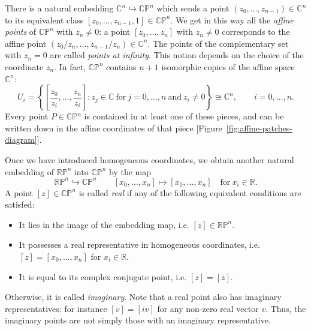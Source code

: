 \documentclass[12pt,a4paper]{article}
\theoremstyle{BoldTopSpacing}
\theoremstyle{BoldTopSpacing}
\theoremstyle{BoldTopSpacing}
\theoremstyle{BoldTopBottomSpacing}
\theoremstyle{BoldTopSpacing}
\theoremstyle{BoldTopBottomSpacing}
\theoremstyle{remark}
\begin{document}
There is a natural embedding $\mathbb{C}^n \hookrightarrow \mathbb{C}\mathbb{P}^n$ which sends a point $(z_{0}, \dots, z_{n-1}) \in \mathbb{C}^n$ to its equivalent class $[z_{0},\dots, z_{n-1}, 1] \in \mathbb{C}\mathbb{P}^n$. We get in this way all the \textit{affine points} of $\mathbb{C}\mathbb{P}^n$ with $z_{n} \neq 0$: a point $[z_{0}, \dots, z_{n}]$ with $z_{n} \neq 0$ corresponds to the affine point $(z_{0}/z_{n}, \dots, z_{n-1}/z_{n}) \in \mathbb{C}^{n}$. The points of the complementary set with $z_{n} = 0$ are called \textit{points at infinity}. This notion depends on the choice of the coordinate $z_{n}$. In fact, $\mathbb{C}\mathbb{P}^n$ contains $n + 1$ isomorphic copies of the affine space $\mathbb{C}^n$:
\[
    U_{i} = \left\{ \left[ \frac{z_{0}}{z_{i}}, \dots, \frac{z_{n}}{z_{i}} \right] : z_{j} \in \mathbb{C} \ \text{for} \ j=0, \dots, n \ \text{and} \ z_{i} \neq 0 \right\} \cong \mathbb{C}^n, \quad \quad i=0, \dots, n.
\]
Every point $P \in \mathbb{C}\mathbb{P}^n$ is contained in at least one of these pieces, and can be written down in the affine coordinates of that piece [Figure~\ref{fig:affine-patches-diagram}].\par
Once we have introduced homogeneous coordinates, we obtain another natural embedding of $\mathbb{R}\mathbb{P}^n$ into $\mathbb{C}\mathbb{P}^n$ by the map
\[
    \mathbb{R}\mathbb{P}^n \hookrightarrow \mathbb{C}\mathbb{P}^n \quad \quad [x_{0}, \dots, x_{n}] \mapsto [x_{0}, \dots, x_{n}] \quad \text{for} \ x_{i} \in \mathbb{R}.
\]
A point $[z] \in \mathbb{C}\mathbb{P}^n$ is called \textit{real} if any of the following equivalent conditions are satisfed:
\begin{itemize}
    \item It lies in the image of the embedding map, i.e. $[z] \in \mathbb{R}\mathbb{P}^n$.
    \item It possesses a real representative in homogeneous coordinates, i.e. $[z] = [x_{0}, \dots, x_{n}]$ for $x_{i} \in \mathbb{R}$.
    \item It is equal to its complex conjugate point, i.e. $[z] = [\bar{z}]$.
\end{itemize}
Otherwise, it is called \textit{imaginary}. Note that a real point also has imaginary representatives: for instance $[v] = [i v]$ for any non-zero real vector $v$. Thus, the imaginary points are not simply those with an imaginary representative.
\end{document}
